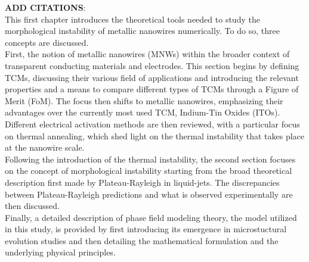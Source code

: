 \textbf{ADD CITATIONS}: \cite{Huong2022} \cite{Willis2021} \cite{Maurya2022} \cite{LagrangeLangleyGiustiJimenezBrechetBellet2015} \cite{LangleyGiustiMayousseCelleBelletSimonato2013} \cite{SohnParkOhKangKim2019} \cite{Bellet2017} \cite{JiuSuganuma2016} \cite{BerginChenRathmellCharbonneauLiWiley2012} \cite{Langley2014} \cite{KwanLeHuan2016} \cite{GrazioliGangiNicolaSimone2024} \cite{Bardet2021} \cite{MarzbanradRiversPengZhaoZhou2015}\\
This first chapter introduces the theoretical tools needed to study the morphological instability of metallic nanowires numerically. To do so, three concepts are discussed.\\
First, the notion of metallic nanowires (MNWs) within the broader context of transparent conducting materials and electrodes. This section begins by defining TCMs, discussing their various field of applications and introducing the relevant properties and a means to compare different types of TCMs through a Figure of Merit (FoM). The focus then shifts to metallic nanowires, emphasizing their advantages over the currently most used TCM, Indium-Tin Oxides (ITOs). Different electrical activation methods are then reviewed, with a particular focus on thermal annealing, which shed light on the thermal instability that takes place at the nanowire scale.\\
Following the introduction of the thermal instability, the second section focuses on the concept of morphological instability starting from the broad theoretical description first made by Plateau-Rayleigh in liquid-jets. The discrepancies between Plateau-Rayleigh predictions and what is observed experimentally are then discussed.\\
Finally, a detailed description of phase field modeling theory, the model utilized in this study, is provided by first introducing its emergence in microstuctural evolution studies and then detailing the mathematical formulation and the underlying physical principles.
